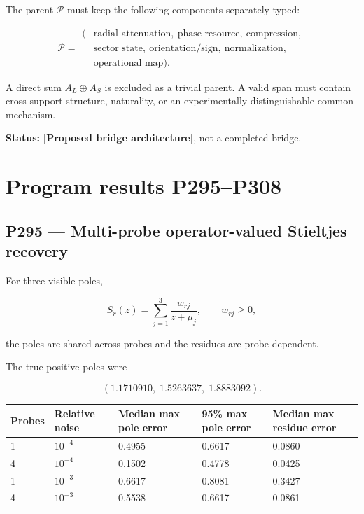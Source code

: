 \documentclass[11pt,a4paper,openany]{report}
\begin{document}
The parent \(\mathcal P\) must keep the following components separately typed:

\[
\mathcal P
=
\begin{aligned}
(&\text{radial attenuation},\ \text{phase resource},\
\text{compression},\\
 &\text{sector state},\ \text{orientation/sign},\
\text{normalization},\\
 &\text{operational map}).
\end{aligned}
\]

A direct sum \(A_L\oplus A_S\) is excluded as a trivial parent. A valid span must contain cross-support structure, naturality, or an experimentally distinguishable common mechanism.

\textbf{Status:} \textbf{[Proposed bridge architecture]}, not a completed bridge.

\chapter{Program results P295--P308}

\section{P295 --- Multi-probe operator-valued Stieltjes recovery}

For three visible poles,

\[
S_r(z)
=
\sum_{j=1}^{3}\frac{w_{rj}}{z+\mu_j},
\qquad
w_{rj}\ge0,
\]

the poles are shared across probes and the residues are probe dependent.

The true positive poles were

\[
(1.1710910,\;1.5263637,\;1.8883092).
\]

\begin{center}
\begingroup\fontsize{7}{8.4}\selectfont
\setlength{\tabcolsep}{2.5pt}
\renewcommand{\arraystretch}{1.16}
\begin{longtable}{@{}p{}p{}p{}p{}p{}@{}}
\toprule
\textbf{Probes} & \textbf{Relative noise} & \textbf{Median max pole error} & \textbf{95\% max pole error} & \textbf{Median max residue error} \\
\midrule
\endhead
1 & \(10^{-4}\) & 0.4955 & 0.6617 & 0.0860 \\
4 & \(10^{-4}\) & 0.1502 & 0.4778 & 0.0425 \\
1 & \(10^{-3}\) & 0.6617 & 0.8081 & 0.3427 \\
4 & \(10^{-3}\) & 0.5538 & 0.6617 & 0.0861 \\
\bottomrule
\end{longtable}
\endgroup
\end{center}
\end{document}
